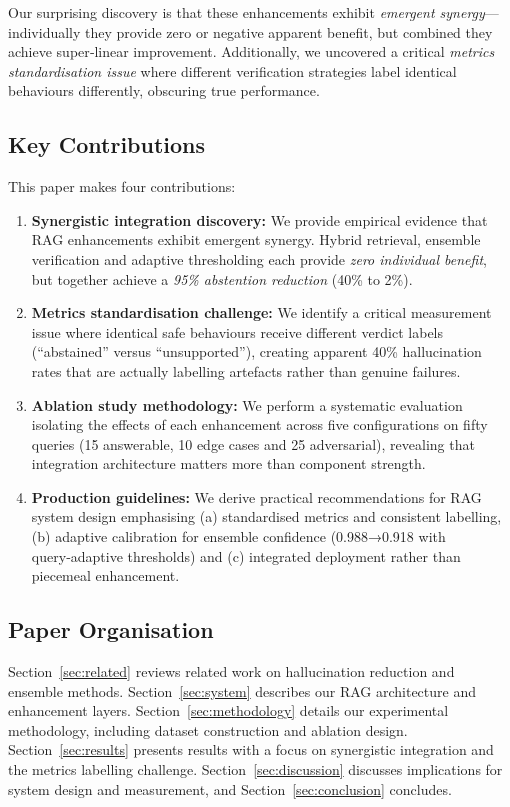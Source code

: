 \documentclass{article}
\begin{document}
Our surprising discovery is that these enhancements exhibit \emph{emergent synergy}—individually they provide zero or negative apparent benefit, but combined they achieve super‑linear improvement. Additionally, we uncovered a critical \emph{metrics standardisation issue} where different verification strategies label identical behaviours differently, obscuring true performance.

\subsection{Key Contributions}

This paper makes four contributions:

\begin{enumerate}
    \item \textbf{Synergistic integration discovery:} We provide empirical evidence that RAG enhancements exhibit emergent synergy. Hybrid retrieval, ensemble verification and adaptive thresholding each provide \emph{zero individual benefit}, but together achieve a \emph{95\% abstention reduction} (40\% to 2\%).
    \item \textbf{Metrics standardisation challenge:} We identify a critical measurement issue where identical safe behaviours receive different verdict labels (“abstained” versus “unsupported”), creating apparent 40\% hallucination rates that are actually labelling artefacts rather than genuine failures.
    \item \textbf{Ablation study methodology:} We perform a systematic evaluation isolating the effects of each enhancement across five configurations on fifty queries (15 answerable, 10 edge cases and 25 adversarial), revealing that integration architecture matters more than component strength.
    \item \textbf{Production guidelines:} We derive practical recommendations for RAG system design emphasising (a) standardised metrics and consistent labelling, (b) adaptive calibration for ensemble confidence (0.988→0.918 with query‑adaptive thresholds) and (c) integrated deployment rather than piecemeal enhancement.
\end{enumerate}

\subsection{Paper Organisation}

Section~\ref{sec:related} reviews related work on hallucination reduction and ensemble methods. Section~\ref{sec:system} describes our RAG architecture and enhancement layers. Section~\ref{sec:methodology} details our experimental methodology, including dataset construction and ablation design. Section~\ref{sec:results} presents results with a focus on synergistic integration and the metrics labelling challenge. Section~\ref{sec:discussion} discusses implications for system design and measurement, and Section~\ref{sec:conclusion} concludes.
\end{document}
